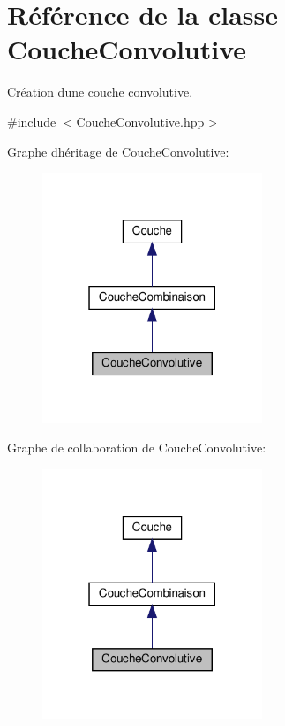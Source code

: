 \hypertarget{class_couche_convolutive}{}\section{Référence de la classe Couche\+Convolutive}
\label{class_couche_convolutive}


Création d\textquotesingle{}une couche convolutive.  




{\ttfamily \#include $<$Couche\+Convolutive.\+hpp$>$}



Graphe d\textquotesingle{}héritage de Couche\+Convolutive\+:\nopagebreak
\begin{figure}[H]
\begin{center}
\leavevmode
\includegraphics[width=187pt]{class_couche_convolutive__inherit__graph}
\end{center}
\end{figure}


Graphe de collaboration de Couche\+Convolutive\+:\nopagebreak
\begin{figure}[H]
\begin{center}
\leavevmode
\includegraphics[width=187pt]{class_couche_convolutive__coll__graph}
\end{center}
\end{figure}

